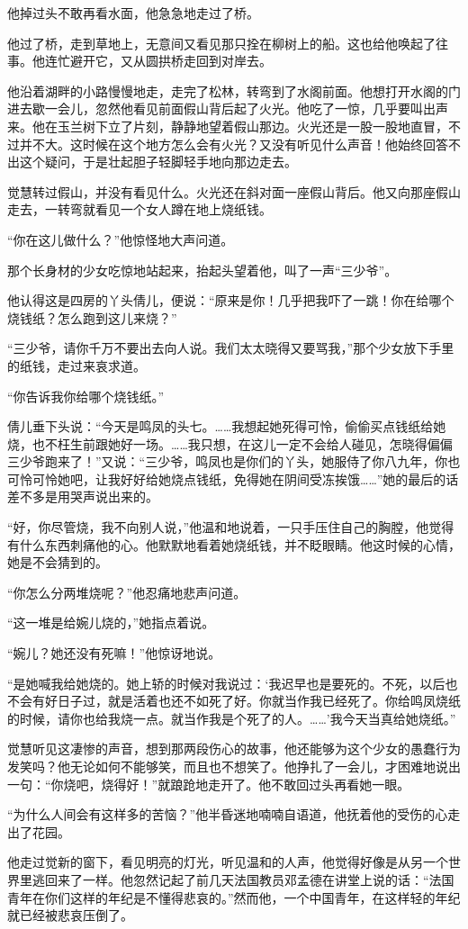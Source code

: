 \par 他掉过头不敢再看水面，他急急地走过了桥。
\par 他过了桥，走到草地上，无意间又看见那只拴在柳树上的船。这也给他唤起了往事。他连忙避开它，又从圆拱桥走回到对岸去。
\par 他沿着湖畔的小路慢慢地走，走完了松林，转弯到了水阁前面。他想打开水阁的门进去歇一会儿，忽然他看见前面假山背后起了火光。他吃了一惊，几乎要叫出声来。他在玉兰树下立了片刻，静静地望着假山那边。火光还是一股一股地直冒，不过并不大。这时候在这个地方怎么会有火光？又没有听见什么声音！他始终回答不出这个疑问，于是壮起胆子轻脚轻手地向那边走去。
\par 觉慧转过假山，并没有看见什么。火光还在斜对面一座假山背后。他又向那座假山走去，一转弯就看见一个女人蹲在地上烧纸钱。
\par “你在这儿做什么？”他惊怪地大声问道。
\par 那个长身材的少女吃惊地站起来，抬起头望着他，叫了一声“三少爷”。
\par 他认得这是四房的丫头倩儿，便说：“原来是你！几乎把我吓了一跳！你在给哪个烧钱纸？怎么跑到这儿来烧？”
\par “三少爷，请你千万不要出去向人说。我们太太晓得又要骂我，”那个少女放下手里的纸钱，走过来哀求道。
\par “你告诉我你给哪个烧钱纸。”
\par 倩儿垂下头说：“今天是鸣凤的头七。……我想起她死得可怜，偷偷买点钱纸给她烧，也不枉生前跟她好一场。……我只想，在这儿一定不会给人碰见，怎晓得偏偏三少爷跑来了！”又说：“三少爷，鸣凤也是你们的丫头，她服侍了你八九年，你也可怜可怜她吧，让我好好给她烧点钱纸，免得她在阴间受冻挨饿……”她的最后的话差不多是用哭声说出来的。
\par “好，你尽管烧，我不向别人说，”他温和地说着，一只手压住自己的胸膛，他觉得有什么东西刺痛他的心。他默默地看着她烧纸钱，并不眨眼睛。他这时候的心情，她是不会猜到的。
\par “你怎么分两堆烧呢？”他忍痛地悲声问道。
\par “这一堆是给婉儿烧的，”她指点着说。
\par “婉儿？她还没有死嘛！”他惊讶地说。
\par “是她喊我给她烧的。她上轿的时候对我说过：‘我迟早也是要死的。不死，以后也不会有好日子过，就是活着也还不如死了好。你就当作我已经死了。你给鸣凤烧纸的时候，请你也给我烧一点。就当作我是个死了的人。……’我今天当真给她烧纸。”
\par 觉慧听见这凄惨的声音，想到那两段伤心的故事，他还能够为这个少女的愚蠢行为发笑吗？他无论如何不能够笑，而且也不想笑了。他挣扎了一会儿，才困难地说出一句：“你烧吧，烧得好！”就踉跄地走开了。他不敢回过头再看她一眼。
\par “为什么人间会有这样多的苦恼？”他半昏迷地喃喃自语道，他抚着他的受伤的心走出了花园。
\par 他走过觉新的窗下，看见明亮的灯光，听见温和的人声，他觉得好像是从另一个世界里逃回来了一样。他忽然记起了前几天法国教员邓孟德在讲堂上说的话：“法国青年在你们这样的年纪是不懂得悲哀的。”然而他，一个中国青年，在这样轻的年纪就已经被悲哀压倒了。


